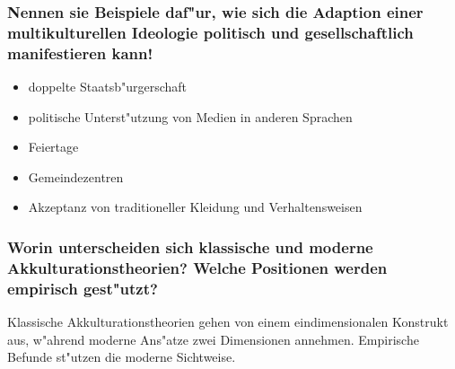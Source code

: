 \subsubsection{Nennen sie Beispiele daf"ur, wie sich die Adaption einer multikulturellen Ideologie politisch und gesellschaftlich manifestieren kann!}
\begin{itemize}
        \item doppelte Staatsb"urgerschaft
        \item politische Unterst"utzung von Medien in anderen Sprachen
        \item Feiertage 
        \item Gemeindezentren
        \item Akzeptanz von traditioneller Kleidung und Verhaltensweisen
\end{itemize}



\subsubsection{Worin unterscheiden sich klassische und moderne Akkulturationstheorien? Welche Positionen werden empirisch gest"utzt?}
Klassische Akkulturationstheorien gehen von einem eindimensionalen Konstrukt aus, w"ahrend moderne Ans"atze zwei Dimensionen annehmen. Empirische Befunde st"utzen die moderne Sichtweise.

